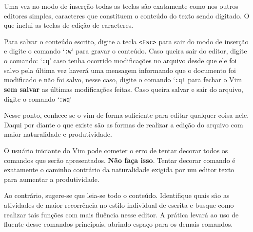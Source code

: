 Uma vez no modo de inserção todas as teclas são exatamente 
como nos outros editores simples, caracteres que constituem o conteúdo do texto 
sendo digitado. 
O que inclui as teclas de edição de caracteres.

Para salvar o conteúdo escrito, digite a tecla
\verb|<Esc>| para sair do modo de inserção e digite o comando `\texttt{:w}'
para gravar o conteúdo.  Caso queira sair do editor,
digite o comando: `\texttt{:q}' caso tenha ocorrido modificações no arquivo
desde que ele foi salvo pela última vez haverá uma mensagem informando que o
documento foi modificado e não foi salvo, nesse caso, digite o comando `\texttt{:q!}
para fechar o Vim {\bf sem salvar} as últimas modificações feitas.  
Caso queira salvar e sair do arquivo, digite o comando `\texttt{:wq}'

%
%

Nesse ponto, conhece-se o vim de forma suficiente para editar
qualquer coisa nele. Daqui por diante o que existe são as formas de
realizar a edição do arquivo com maior naturalidade e produtividade.

O usuário iniciante do Vim pode cometer o erro de tentar decorar 
todos os comandos que serão apresentados. {\bf Não faça isso}. Tentar decorar
comando é exatamente o caminho contrário da naturalidade exigida por 
um editor texto para aumentar a produtividade.

Ao contrário, sugere-se que leia-se todo o conteúdo. Identifique 
quais são as atividades de maior recorrência no estilo individual de 
escrita e busque como realizar tais funções com mais fluência nesse
editor. A prática levará ao uso de fluente desse comandos principais,
abrindo espaço para os demais comandos.


